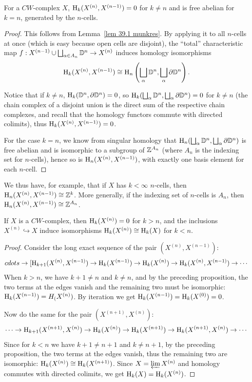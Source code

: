 \begin{prop}
    For a $CW$-complex $X$, $\mathrm{H}_k(X^{(n)},X^{(n-1)})=0$ for $k\neq n$ and is free abelian for $k=n$, generated by the $n$-cells.
\end{prop}
\begin{proof}
    This follows from Lemma~\ref{lem 39.1 munkres}. By applying it to all $n$-cells at once (which is easy because open cells are disjoint), the ``total'' characteristic map $f:X^{(n-1)}\cup \bigsqcup_{\alpha\in A_n} \mathbb{D}^n\to X^{(n)}$ induces homology isomorphisms
    \[\mathrm{H}_k(X^{(n)},X^{(n-1)})\cong \mathrm{H}_n\left(\bigsqcup_\alpha \mathbb{D}^n,\bigsqcup_\alpha \partial \mathbb{D}^n\right).\]
    
    Notice that if $k\neq n$, $\mathrm{H}_k(\mathbb{D}^n,\partial \mathbb{D}^n)=0$, so $\mathrm{H}_k(\bigsqcup_\alpha \mathbb{D}^n,\bigsqcup_\alpha \partial \mathbb{D}^n)=0$ for $k\neq n$ (the chain complex of a disjoint union is the direct sum of the respective chain complexes, and recall that the homology functors commute with directed colimits), thus $\mathrm{H}_k(X^{(n)},X^{(n-1)})=0$.

    For the case $k=n$, we know from singular homology that $\mathrm{H}_n(\bigsqcup_\alpha \mathbb{D}^n,\bigsqcup_\alpha \partial \mathbb{D}^n)$ is free abelian and is isomorphic to a subgroup of $\mathbb{Z}^{A_n}$ (where $A_n$ is the indexing set for $n$-cells), hence so is $\mathrm{H}_n(X^{(n)},X^{(n-1)})$, with exactly one basis element for each $n$-cell.
\end{proof}

We thus have, for example, that if $X$ has $k<\infty$ $n$-cells, then $\mathrm{H}_n(X^{(n)},X^{(n-1)})\cong \mathbb{Z}^k$. More generally, if the indexing set of $n$-cells is $A_n$, then $\mathrm{H}_n(X^{(n)},X^{(n-1)})\cong\mathbb{Z}^{A_n}$.

\begin{prop}
    If $X$ is a $CW$-complex, then $\mathrm{H}_k(X^{(n)})=0$ for $k>n$, and the inclusions $X^{(n)}\hookrightarrow X$ induce isomorphisms $\mathrm{H}_k(X^{(n)})\cong \mathrm{H}_k(X)$ for $k<n$.
\end{prop}
\begin{proof}
    Consider the long exact sequence of the pair $(X^{(n)},X^{(n-1)})$:
    \[cdots\to [\mathrm{H}_{k+1}(X^{(n)},X^{(n-1)})\to \mathrm{H}_k(X^{(n-1)})\to \mathrm{H}_k(X^{(n)})\to \mathrm{H}_k(X^{(n)},X^{(n-1)})\to\cdots \]
    When $k>n$, we have $k+1\neq n$ and $k\neq n$, and by the preceding proposition, the two terms at the edges vanish and the remaining two must be isomorphic: $\mathrm{H}_k(X^{(n-1)})=H_(X^{(n)})$. By iteration we get $\mathrm{H}_k(X^{(n-1)})=\mathrm{H}_k(X^{(0)})=0$.
    
    Now do the same for the pair $(X^{(n+1)},X^{(n)})$:
    \[\cdots\to \mathrm{H}_{k+1}(X^{(n+1)},X^{(n)})\to \mathrm{H}_k(X^{(n)})\to \mathrm{H}_k(X^{(n+1)})\to \mathrm{H}_k(X^{(n+1)},X^{(n)})\to\cdots \]
    Since for $k<n$ we have $k+1\neq n+1$ and $k\neq n+1$, by the preceding proposition, the two terms at the edges vanish, thus the remaining two are isomorphic: $\mathrm{H}_k(X^{(n)})\cong \mathrm{H}_k(X^{(n+1)})$. Since $X=\varprojlim X^{(n)}$ and homology commutes with directed colimits, we get $\mathrm{H}_k(X)=\mathrm{H}_k(X^{(n)})$.
\end{proof}

